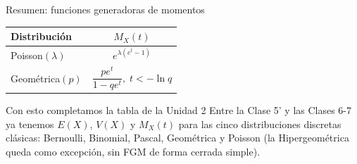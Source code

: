 \documentclass[aspectratio=169,11pt]{beamer}
\begin{document}
\begin{frame}{Resumen: funciones generadoras de momentos}
\begin{center}
\begin{tabular}{lc}
\toprule
\textbf{Distribución} & \textbf{$M_X(t)$} \\
\midrule
Poisson$(\lambda)$ & $e^{\lambda(e^t-1)}$ \\
Geométrica$(p)$ & $\dfrac{pe^t}{1-qe^t}, \; t<-\ln q$ \\
\bottomrule
\end{tabular}
\end{center}

\begin{alertblock}{Con esto completamos la tabla de la Unidad 2}
Entre la Clase 5' y las Clases 6-7 ya tenemos $E(X)$, $V(X)$ y $M_X(t)$ para las cinco distribuciones discretas clásicas: Bernoulli, Binomial, Pascal, Geométrica y Poisson (la Hipergeométrica queda como excepción, sin FGM de forma cerrada simple).
\end{alertblock}
\end{frame}
\end{document}
